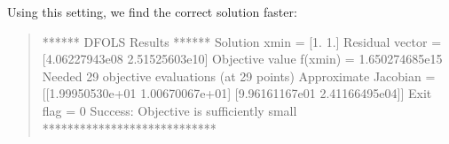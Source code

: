 \documentclass[letterpaper,10pt,english]{sphinxmanual}
\begin{document}
\sphinxAtStartPar
Using this setting, we find the correct solution faster:
\begin{quote}

\begin{sphinxVerbatim}[commandchars=\\\{\}]
****** DFO\PYGZhy{}LS Results ******
Solution xmin = [1. 1.]
Residual vector = [\PYGZhy{}4.06227943e\PYGZhy{}08  2.51525603e\PYGZhy{}10]
Objective value f(xmin) = 1.650274685e\PYGZhy{}15
Needed 29 objective evaluations (at 29 points)
Approximate Jacobian = [[\PYGZhy{}1.99950530e+01  1.00670067e+01]
 [\PYGZhy{}9.96161167e\PYGZhy{}01 \PYGZhy{}2.41166495e\PYGZhy{}04]]
Exit flag = 0
Success: Objective is sufficiently small
****************************
\end{sphinxVerbatim}
\end{quote}
\end{document}
